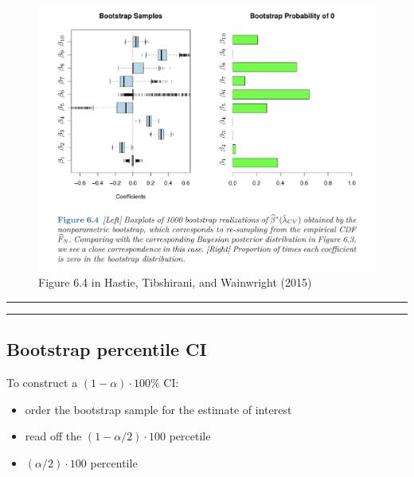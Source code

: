 \documentclass[
  letterpaper,
  DIV=11,
  numbers=noendperiod]{scrartcl}
\providecommand{\tightlist}{%
  \setlength{\itemsep}{0pt}\setlength{\parskip}{0pt}}\usepackage{longtable,booktabs,array}
\begin{document}
\begin{figure}

{\centering \includegraphics[width=1\textwidth,height=\textheight]{./HTWFig64.jpg}

}

\caption{Figure 6.4 in Hastie, Tibshirani, and Wainwright (2015)}

\end{figure}

\begin{center}\rule{0.5\linewidth}{0.5pt}\end{center}

\begin{center}\rule{0.5\linewidth}{0.5pt}\end{center}

\hypertarget{bootstrap-percentile-ci}{%
\subsection{Bootstrap percentile CI}\label{bootstrap-percentile-ci}}

To construct a \((1-\alpha)\cdot 100\)\% CI:

\begin{itemize}
\tightlist
\item
  order the bootstrap sample for the estimate of interest
\item
  read off the \((1-\alpha/2)\cdot 100\) percetile
\item
  \((\alpha/2)\cdot 100\) percentile
\end{itemize}
\end{document}
